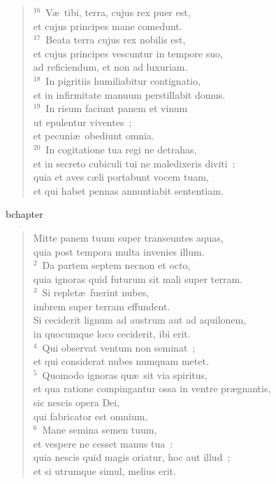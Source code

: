 \begin{verse}${}^{16}$~V\ae\ tibi, terra, cujus rex puer est,\\ et cujus principes mane comedunt.\\
${}^{17}$~Beata terra cujus rex nobilis est,\\ et cujus principes vescuntur in tempore suo,\\ ad reficiendum, et non ad luxuriam.\\
${}^{18}$~In pigritiis humiliabitur contignatio,\\ et in infirmitate manuum perstillabit domus.\\
${}^{19}$~In risum faciunt panem et vinum\\ ut epulentur viventes~;\\ et pecuni\ae\ obediunt omnia.\\
${}^{20}$~In cogitatione tua regi ne detrahas,\\ et in secreto cubiculi tui ne maledixeris diviti~:\\ quia et aves c\ae li portabunt vocem tuam,\\ et qui habet pennas annuntiabit sententiam.\end{verse}


bchapter\begin{verse}\vspace{-19pt}Mitte panem tuum super transeuntes aquas,\\ quia post tempora multa invenies illum.\\
${}^{2}$~Da partem septem necnon et octo,\\ quia ignoras quid futurum sit mali super terram.\\
${}^{3}$~Si replet\ae\ fuerint nubes,\\ imbrem super terram effundent.\\ Si ceciderit lignum ad austrum aut ad aquilonem,\\ in quocumque loco ceciderit, ibi erit.\\
${}^{4}$~Qui observat ventum non seminat~;\\ et qui considerat nubes numquam metet.\\
${}^{5}$~Quomodo ignoras qu\ae\ sit via spiritus,\\ et qua ratione compingantur ossa in ventre pr\ae gnantis,\\ sic nescis opera Dei,\\ qui fabricator est omnium.\\
${}^{6}$~Mane semina semen tuum,\\ et vespere ne cesset manus tua~:\\ quia nescis quid magis oriatur, hoc aut illud~;\\ et si utrumque simul, melius erit.\end{verse}


